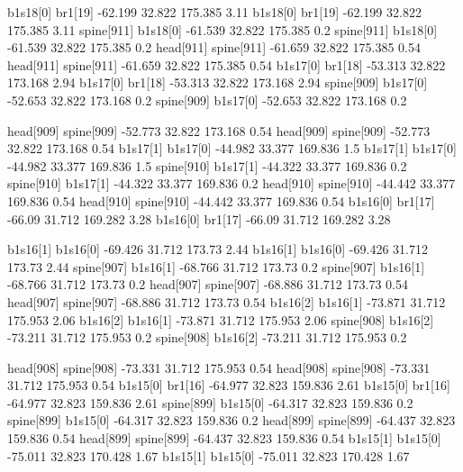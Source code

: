 b1s18[0]    br1[19]    -62.199    32.822    175.385    3.11
b1s18[0]    br1[19]    -62.199    32.822    175.385    3.11
spine[911]    b1s18[0]    -61.539    32.822    175.385    0.2
spine[911]    b1s18[0]    -61.539    32.822    175.385    0.2
head[911]    spine[911]    -61.659    32.822    175.385    0.54
head[911]    spine[911]    -61.659    32.822    175.385    0.54
b1s17[0]    br1[18]    -53.313    32.822    173.168    2.94
b1s17[0]    br1[18]    -53.313    32.822    173.168    2.94
spine[909]    b1s17[0]    -52.653    32.822    173.168    0.2
spine[909]    b1s17[0]    -52.653    32.822    173.168    0.2


head[909]    spine[909]    -52.773    32.822    173.168    0.54
head[909]    spine[909]    -52.773    32.822    173.168    0.54
b1s17[1]    b1s17[0]    -44.982    33.377    169.836    1.5
b1s17[1]    b1s17[0]    -44.982    33.377    169.836    1.5
spine[910]    b1s17[1]    -44.322    33.377    169.836    0.2
spine[910]    b1s17[1]    -44.322    33.377    169.836    0.2
head[910]    spine[910]    -44.442    33.377    169.836    0.54
head[910]    spine[910]    -44.442    33.377    169.836    0.54
b1s16[0]    br1[17]    -66.09    31.712    169.282    3.28
b1s16[0]    br1[17]    -66.09    31.712    169.282    3.28


b1s16[1]    b1s16[0]    -69.426    31.712    173.73    2.44
b1s16[1]    b1s16[0]    -69.426    31.712    173.73    2.44
spine[907]    b1s16[1]    -68.766    31.712    173.73    0.2
spine[907]    b1s16[1]    -68.766    31.712    173.73    0.2
head[907]    spine[907]    -68.886    31.712    173.73    0.54
head[907]    spine[907]    -68.886    31.712    173.73    0.54
b1s16[2]    b1s16[1]    -73.871    31.712    175.953    2.06
b1s16[2]    b1s16[1]    -73.871    31.712    175.953    2.06
spine[908]    b1s16[2]    -73.211    31.712    175.953    0.2
spine[908]    b1s16[2]    -73.211    31.712    175.953    0.2


head[908]    spine[908]    -73.331    31.712    175.953    0.54
head[908]    spine[908]    -73.331    31.712    175.953    0.54
b1s15[0]    br1[16]    -64.977    32.823    159.836    2.61
b1s15[0]    br1[16]    -64.977    32.823    159.836    2.61
spine[899]    b1s15[0]    -64.317    32.823    159.836    0.2
spine[899]    b1s15[0]    -64.317    32.823    159.836    0.2
head[899]    spine[899]    -64.437    32.823    159.836    0.54
head[899]    spine[899]    -64.437    32.823    159.836    0.54
b1s15[1]    b1s15[0]    -75.011    32.823    170.428    1.67
b1s15[1]    b1s15[0]    -75.011    32.823    170.428    1.67


